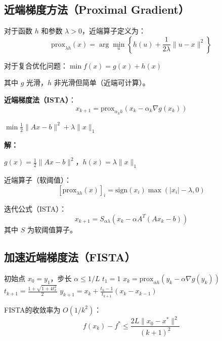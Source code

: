 \subsection{近端梯度方法（Proximal Gradient）}\label{sec:proximal}

\begin{conceptbox}[近端算子]
对于函数 $h$ 和参数 $\lambda > 0$，近端算子定义为：
\[
\text{prox}_{\lambda h}(x) = \arg\min_u \left\{h(u) + \frac{1}{2\lambda}\|u - x\|^2\right\}
\]
\end{conceptbox}

对于复合优化问题：$\min f(x) = g(x) + h(x)$

其中 $g$ 光滑，$h$ 非光滑但简单（近端可计算）。

\textbf{近端梯度法（ISTA）}：
\[
x_{k+1} = \text{prox}_{\alpha_k h}(x_k - \alpha_k \nabla g(x_k))
\]

\begin{example}[LASSO问题]
$\min \frac{1}{2}\|Ax - b\|^2 + \lambda\|x\|_1$

\textbf{解：}

$g(x) = \frac{1}{2}\|Ax - b\|^2$，$h(x) = \lambda\|x\|_1$

近端算子（软阈值）：
\[
[\text{prox}_{\lambda h}(x)]_i = \text{sign}(x_i) \max(|x_i| - \lambda, 0)
\]

迭代公式（ISTA）：
\[
x_{k+1} = S_{\alpha \lambda}(x_k - \alpha A^T(Ax_k - b))
\]
其中 $S$ 为软阈值算子。
\end{example}

\subsection{加速近端梯度法（FISTA）}\label{sec:fista}

\begin{algorithm}[H]
\caption{FISTA}
\begin{algorithmic}[1]
\Require 初始点 $x_0 = y_1$，步长 $\alpha \leq 1/L$
\State $t_1 = 1$
    \State $x_k = \text{prox}_{\alpha h}(y_k - \alpha \nabla g(y_k))$
    \State $t_{k+1} = \frac{1 + \sqrt{1 + 4t_k^2}}{2}$
    \State $y_{k+1} = x_k + \frac{t_k - 1}{t_{k+1}}(x_k - x_{k-1})$
\EndFor
\end{algorithmic}
\end{algorithm}

\begin{theorem}[FISTA收敛率]
FISTA的收敛率为 $O(1/k^2)$：
\[
f(x_k) - f^* \leq \frac{2L\|x_0 - x^*\|^2}{(k+1)^2}
\]
\end{theorem}

